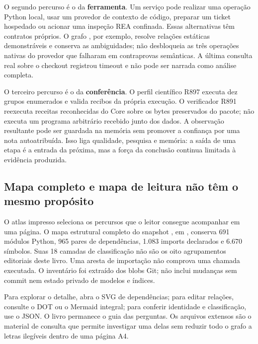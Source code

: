O segundo percurso é o da \textbf{ferramenta}. Um serviço pode realizar uma operação
Python local, usar um provedor de contexto de código, preparar um ticket hospedado
ou acionar uma inspeção REA confinada. Essas alternativas têm contratos próprios.
O grafo , por exemplo, resolve relações estáticas demonstráveis
e conserva as ambiguidades; não desbloqueia as três operações nativas do provedor
que falharam em contraprovas semânticas. A última consulta real sobre o checkout
registrou timeout e não pode ser narrada como análise completa.

O terceiro percurso é o da \textbf{conferência}. O perfil científico R897 executa
dez grupos enumerados e valida recibos da própria execução. O verificador R891
reexecuta receitas reconhecidas do Core sobre os bytes preservados do pacote;
não executa um programa arbitrário recebido junto dos dados. A observação resultante
pode ser guardada na memória sem promover a confiança por uma nota autoatribuída.
Isso liga qualidade, pesquisa e memória: a saída de uma etapa é a entrada da próxima,
mas a força da conclusão continua limitada à evidência produzida.

\subsection{Mapa completo e mapa de leitura não têm o mesmo propósito}

O atlas impresso seleciona os percursos que o leitor consegue acompanhar em uma
página. O mapa estrutural completo do snapshot , em
, conserva 691 módulos Python, 965 pares de dependências,
1.083 imports declarados e 6.670 símbolos. Suas 18 camadas de classificação não
são os oito agrupamentos editoriais deste livro. Uma aresta de importação não
comprova uma chamada executada. O inventário foi extraído dos blobs Git; não
inclui mudanças sem commit nem estado privado de modelos e índices.

Para explorar o detalhe, abra o SVG de dependências; para editar relações,
consulte o DOT ou o Mermaid integral; para conferir identidade e classificação,
use o JSON. O livro permanece o guia das perguntas. Os arquivos extensos são o
material de consulta que permite investigar uma delas sem reduzir todo o grafo
a letras ilegíveis dentro de uma página A4.

